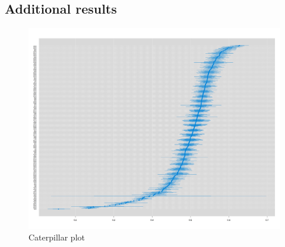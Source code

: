 \documentclass[12pt]{article}
\begin{document}
\subsection{Additional results}

\begin{figure}[!h]
    \centering
    \includegraphics[width=1\linewidth]{pictures/caterpillar.png}
    \caption{Caterpillar plot}
    \label{fig:fullcaterpillar}
\end{figure}
\end{document}
